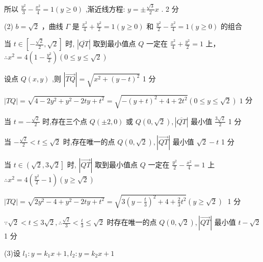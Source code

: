 \documentclass[10pt]{article}
\begin{document}
所以 \(\frac{{y}^{2}}{3} - \frac{{x}^{2}}{4} = 1\left( {y \geq  0}\right)\) ,渐近线方程: \(y =  \pm  \frac{\sqrt{3}}{2}x\) . 2 分

(2) \(b = \sqrt{2}\) ，曲线 \(\Gamma\) 是 \(\frac{{x}^{2}}{4} + \frac{{y}^{2}}{2} = 1\left( {y \geq  0}\right)\) 和 \(\frac{{y}^{2}}{2} - \frac{{x}^{2}}{4} = 1\left( {y \geq  0}\right)\) 的组合

当 \(t \in  \left\lbrack  {-\frac{\sqrt{2}}{2},\sqrt{2}}\right\rbrack\) 时, \(\left| \overline{QT}\right|\) 取到最小值点 \(Q\) 一定在 \(\frac{{x}^{2}}{4} + \frac{{y}^{2}}{2} = 1\) 上， \(\therefore {x}^{2} = 4\left( {1 - \frac{{y}^{2}}{2}}\right) \left( {0 \leq  y \leq  \sqrt{2}}\right)\)

设点 \(Q\left( {x,y}\right)\) ,则 \(\left| \overrightarrow{TQ}\right|  = \sqrt{{x}^{2} + {\left( y - t\right) }^{2}}\) 1 分

\(\left| {TQ}\right|  = \sqrt{4 - 2{y}^{2} + {y}^{2} - {2ty} + {t}^{2}} = \sqrt{-{\left( y + t\right) }^{2} + 4 + 2{t}^{2}}\left( {0 \leq  y \leq  \sqrt{2}}\right) \;1\) 分

当 \(t =  - \frac{\sqrt{2}}{2}\) 时,存在三个点 \(Q\left( {\pm 2,0}\right)\) 或 \(Q\left( {0,\sqrt{2}}\right) ,\left| \overline{QT}\right|\) 最小值 \(\frac{3\sqrt{2}}{2}\) 1 分

当 \(- \frac{\sqrt{2}}{2} < t \leq  \sqrt{2}\) 时,存在唯一的点 \(Q\left( {0,\sqrt{2}}\right) ,\left| \overrightarrow{QT}\right|\) 最小值 \(\sqrt{2} - t\) 1 分

当 \(t \in  \left( {\sqrt{2},3\sqrt{2}}\right\rbrack\) 时, \(\left| \overrightarrow{QT}\right|\) 取到最小值点 \(Q\) 一定在 \(\frac{{y}^{2}}{2} - \frac{{x}^{2}}{4} = 1\) 上 \(\therefore {x}^{2} = 4\left( {\frac{{y}^{2}}{2} - 1}\right) \left( {y \geq  \sqrt{2}}\right)\)

\(\left| {TQ}\right|  = \sqrt{2{y}^{2} - 4 + {y}^{2} - {2ty} + {t}^{2}} = \sqrt{3{\left( y - \frac{t}{3}\right) }^{2} + 4 + \frac{2}{3}{t}^{2}}\left( {y \geq  \sqrt{2}}\right) \;\) 1 分

\(\because \sqrt{2} < t \leq  3\sqrt{2},\therefore \frac{\sqrt{2}}{3} < \frac{t}{3} \leq  \sqrt{2}\) 时存在唯一的点 \(Q\left( {0,\sqrt{2}}\right) ,\left| \overrightarrow{QT}\right|\) 最小值 \(t - \sqrt{2}\) 1 分

(3)设 \({l}_{1} : y = {k}_{1}x + 1,{l}_{2} : y = {k}_{2}x + 1\)
\end{document}
